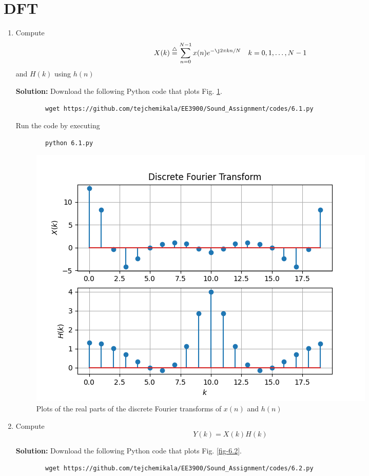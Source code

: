 \documentclass[journal,12pt,twocolumn]{IEEEtran}
\newcommand{\solution}{\noindent \textbf{Solution: }}
\numberwithin{equation}{section}
\renewcommand\thesection{\arabic{section}}
\newcommand{\define}{\stackrel{\triangle}{=}}
\begin{document}
	\section{DFT}
	\begin{enumerate}[label=\thesection.\arabic*]
	\item Compute
	\begin{equation}
		X(k) \define \sum _{n=0}^{N-1}x(n) e^{-\j2\pi kn/N} \quad k = 0,1,\dots, N-1
	\end{equation}
	and $H(k)$ using $h(n)$
	
	\solution Download the following Python code that plots Fig. \ref{fig-6.1}.
	\begin{lstlisting}
		wget https://github.com/tejchemikala/EE3900/Sound_Assignment/codes/6.1.py
	\end{lstlisting}
	
	Run the code by executing
	\begin{lstlisting}
		python 6.1.py
	\end{lstlisting}

	\begin{figure}[!ht]
		\centering
		\includegraphics[width=\columnwidth]{./figs/6.1.png}
		\caption{Plots of the real parts of the discrete Fourier transforms of $x(n)$ and $h(n)$}
		\label{fig-6.1}	
	\end{figure}
	
	\item Compute 
	\begin{equation}
		Y(k) = X(k)H(k)
	\end{equation}
	
	\solution Download the following Python code that plots Fig. \ref{fig-6.2}.
	\begin{lstlisting}
		wget https://github.com/tejchemikala/EE3900/Sound_Assignment/codes/6.2.py
	\end{lstlisting}
	

\end{enumerate}
\end{document}
